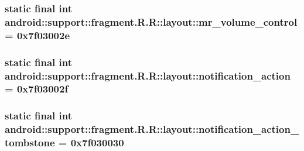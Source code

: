 \hypertarget{classandroid_1_1support_1_1fragment_1_1_r_1_1layout_e67ba98ee1768d60530c9208dde5d1a1}{
\subsubsection[{mr\_\-volume\_\-control}]{\setlength{\rightskip}{0pt plus 5cm}static final int android::support::fragment.R.R::layout::mr\_\-volume\_\-control = 0x7f03002e}}
\label{classandroid_1_1support_1_1fragment_1_1_r_1_1layout_e67ba98ee1768d60530c9208dde5d1a1}


\hypertarget{classandroid_1_1support_1_1fragment_1_1_r_1_1layout_be331cb0dc308926f0e114f46285ef3f}{
\subsubsection[{notification\_\-action}]{\setlength{\rightskip}{0pt plus 5cm}static final int android::support::fragment.R.R::layout::notification\_\-action = 0x7f03002f}}
\label{classandroid_1_1support_1_1fragment_1_1_r_1_1layout_be331cb0dc308926f0e114f46285ef3f}


\hypertarget{classandroid_1_1support_1_1fragment_1_1_r_1_1layout_713b090945f8135c8a9a09aeebe9d26c}{
\subsubsection[{notification\_\-action\_\-tombstone}]{\setlength{\rightskip}{0pt plus 5cm}static final int android::support::fragment.R.R::layout::notification\_\-action\_\-tombstone = 0x7f030030}}
\label{classandroid_1_1support_1_1fragment_1_1_r_1_1layout_713b090945f8135c8a9a09aeebe9d26c}


